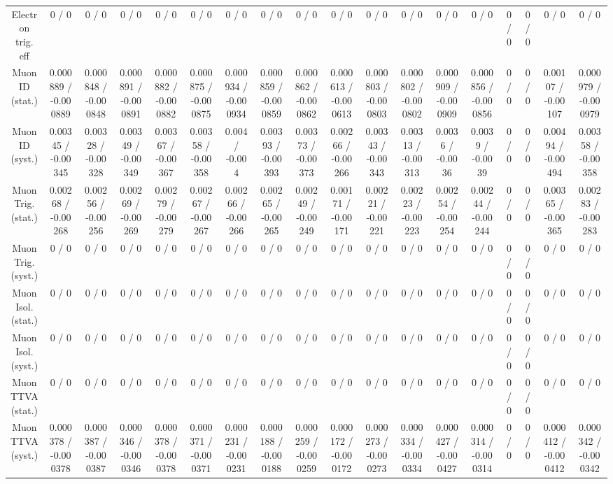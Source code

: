 \documentclass[10pt]{article}
\begin{document}
\begin{table}[htbp]
\begin{center}
\begin{tabular}{|c|c|c|c|c|c|c|c|c|c|c|c|c|c|c|c|c|c|}
  Electron trig. eff & 0 / 0 & 0 / 0 & 0 / 0 & 0 / 0 & 0 / 0 & 0 / 0 & 0 / 0 & 0 / 0 & 0 / 0 & 0 / 0 & 0 / 0 & 0 / 0 & 0 / 0 & 0 / 0 & 0 / 0 & 0 / 0 & 0 / 0 \\ 
  Muon ID (stat.) & 0.000889 / -0.000889 & 0.000848 / -0.000848 & 0.000891 / -0.000891 & 0.000882 / -0.000882 & 0.000875 / -0.000875 & 0.000934 / -0.000934 & 0.000859 / -0.000859 & 0.000862 / -0.000862 & 0.000613 / -0.000613 & 0.000803 / -0.000803 & 0.000802 / -0.000802 & 0.000909 / -0.000909 & 0.000856 / -0.000856 & 0 / 0 & 0 / 0 & 0.00107 / -0.00107 & 0.000979 / -0.000979 \\ 
  Muon ID (syst.) & 0.00345 / -0.00345 & 0.00328 / -0.00328 & 0.00349 / -0.00349 & 0.00367 / -0.00367 & 0.00358 / -0.00358 & 0.004 / -0.004 & 0.00393 / -0.00393 & 0.00373 / -0.00373 & 0.00266 / -0.00266 & 0.00343 / -0.00343 & 0.00313 / -0.00313 & 0.0036 / -0.0036 & 0.0039 / -0.0039 & 0 / 0 & 0 / 0 & 0.00494 / -0.00494 & 0.00358 / -0.00358 \\ 
  Muon Trig. (stat.) & 0.00268 / -0.00268 & 0.00256 / -0.00256 & 0.00269 / -0.00269 & 0.00279 / -0.00279 & 0.00267 / -0.00267 & 0.00266 / -0.00266 & 0.00265 / -0.00265 & 0.00249 / -0.00249 & 0.00171 / -0.00171 & 0.00221 / -0.00221 & 0.00223 / -0.00223 & 0.00254 / -0.00254 & 0.00244 / -0.00244 & 0 / 0 & 0 / 0 & 0.00365 / -0.00365 & 0.00283 / -0.00283 \\ 
  Muon Trig. (syst.) & 0 / 0 & 0 / 0 & 0 / 0 & 0 / 0 & 0 / 0 & 0 / 0 & 0 / 0 & 0 / 0 & 0 / 0 & 0 / 0 & 0 / 0 & 0 / 0 & 0 / 0 & 0 / 0 & 0 / 0 & 0 / 0 & 0 / 0 \\ 
  Muon Isol. (stat.) & 0 / 0 & 0 / 0 & 0 / 0 & 0 / 0 & 0 / 0 & 0 / 0 & 0 / 0 & 0 / 0 & 0 / 0 & 0 / 0 & 0 / 0 & 0 / 0 & 0 / 0 & 0 / 0 & 0 / 0 & 0 / 0 & 0 / 0 \\ 
  Muon Isol. (syst.) & 0 / 0 & 0 / 0 & 0 / 0 & 0 / 0 & 0 / 0 & 0 / 0 & 0 / 0 & 0 / 0 & 0 / 0 & 0 / 0 & 0 / 0 & 0 / 0 & 0 / 0 & 0 / 0 & 0 / 0 & 0 / 0 & 0 / 0 \\ 
  Muon TTVA (stat.) & 0 / 0 & 0 / 0 & 0 / 0 & 0 / 0 & 0 / 0 & 0 / 0 & 0 / 0 & 0 / 0 & 0 / 0 & 0 / 0 & 0 / 0 & 0 / 0 & 0 / 0 & 0 / 0 & 0 / 0 & 0 / 0 & 0 / 0 \\ 
  Muon TTVA (syst.) & 0.000378 / -0.000378 & 0.000387 / -0.000387 & 0.000346 / -0.000346 & 0.000378 / -0.000378 & 0.000371 / -0.000371 & 0.000231 / -0.000231 & 0.000188 / -0.000188 & 0.000259 / -0.000259 & 0.000172 / -0.000172 & 0.000273 / -0.000273 & 0.000334 / -0.000334 & 0.000427 / -0.000427 & 0.000314 / -0.000314 & 0 / 0 & 0 / 0 & 0.000412 / -0.000412 & 0.000342 / -0.000342 \\ 

\end{tabular}
\end{center}
\end{table}
\end{document}
